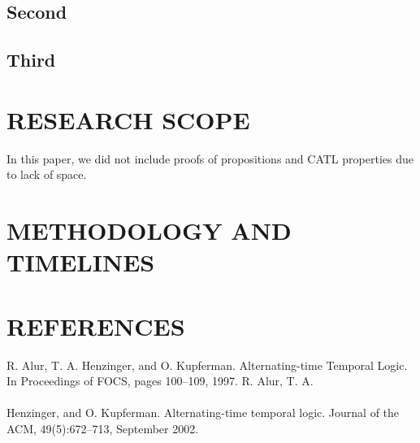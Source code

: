 \documentclass[10pt,a4paper]{article}
\begin{document}
\subsection{Second}

\subsection{Third}

\section{RESEARCH SCOPE}
In this paper, we did not include proofs of propositions and CATL properties due to lack of space.


\section{METHODOLOGY AND TIMELINES}

\section{REFERENCES}


R. Alur, T. A. Henzinger, and O. Kupferman. Alternating-time Temporal Logic. In Proceedings of FOCS, pages 100–109, 1997.  R. Alur, T. A.\\\\Henzinger, and O. Kupferman.
Alternating-time temporal logic. Journal of the ACM, 49(5):672–713, September 2002.
 
	
\end{document}
